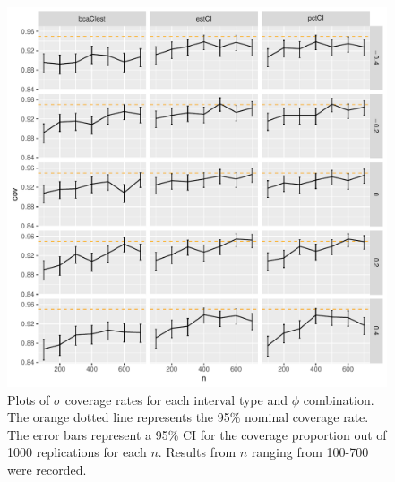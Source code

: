 \documentclass[12pt, letterpaper, titlepage]{article}
\begin{document}
\begin{figure}[tbp]
  \centering
  \includegraphics[width=\textwidth]{figures/plot_sigma}
  \caption{Plots of $\sigma$ coverage rates for each interval type and $\phi$
    combination. The orange dotted line represents the 95\% nominal coverage
    rate. The error bars represent a 95\% CI for the coverage
    proportion out of 1000 replications for each $n$. Results from $n$
    ranging from 100-700 were recorded.}
  \label{fig:sigma}
\end{figure}
\end{document}
